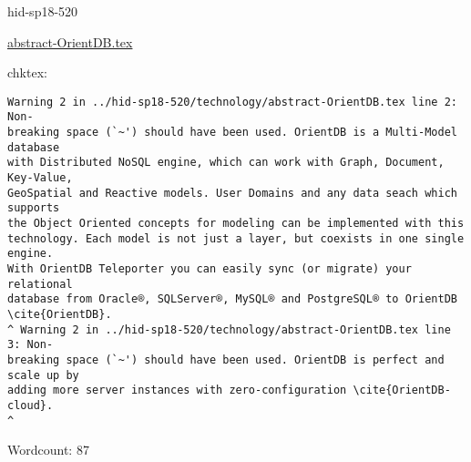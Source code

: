 

\begin{IU}

hid-sp18-520

\href{https://github.com/cloudmesh-community/hid-sp18-520/blob/master//technology/abstract-OrientDB.tex}{abstract-OrientDB.tex}

 
chktex:
\begin{tiny}
\begin{verbatim}
Warning 2 in ../hid-sp18-520/technology/abstract-OrientDB.tex line 2: Non-
breaking space (`~') should have been used. OrientDB is a Multi-Model database
with Distributed NoSQL engine, which can work with Graph, Document, Key-Value,
GeoSpatial and Reactive models. User Domains and any data seach which supports
the Object Oriented concepts for modeling can be implemented with this
technology. Each model is not just a layer, but coexists in one single engine.
With OrientDB Teleporter you can easily sync (or migrate) your relational
database from Oracle®, SQLServer®, MySQL® and PostgreSQL® to OrientDB
\cite{OrientDB}.
^ Warning 2 in ../hid-sp18-520/technology/abstract-OrientDB.tex line 3: Non-
breaking space (`~') should have been used. OrientDB is perfect and scale up by
adding more server instances with zero-configuration \cite{OrientDB-cloud}.
^
\end{verbatim}
\end{tiny}

Wordcount: 87

\end{IU}



